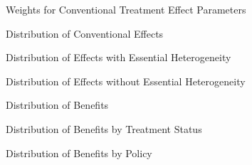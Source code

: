 \begin{frame}
\begin{figure}\caption{Weights for Conventional Treatment Effect Parameters}
\end{figure}
\end{frame}


\begin{frame}
\begin{figure}\caption{Distribution of Conventional Effects}
\end{figure}
\end{frame}

\begin{frame}
\begin{figure}\caption{Distribution of Effects with Essential Heterogeneity}
\end{figure}
\end{frame}


\begin{frame}
\begin{figure}\caption{Distribution of Effects without Essential Heterogeneity}
\end{figure}
\end{frame}

\begin{frame}
\begin{figure}\caption{Distribution of Benefits}
\end{figure}
\end{frame}

\begin{frame}
\begin{figure}\caption{Distribution of Benefits by Treatment Status}
\end{figure}
\end{frame}

\begin{frame}
\begin{figure}\caption{Distribution of Benefits by Policy}
\end{figure}
\end{frame}


